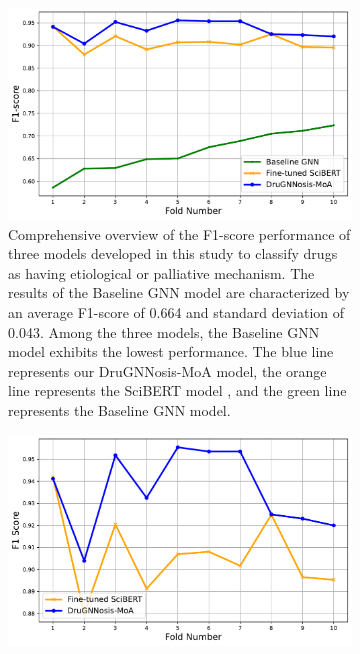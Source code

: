 \documentclass[journal,twoside,web]{ieeecolor}
\begin{document}

\begin{figure}[H]
\centering
\begin{subfigure}[H]{\linewidth}
   \includegraphics[width=\linewidth]{Figures/Comparison_F1_Scores_3_models.pdf}
   \caption{Comprehensive overview of the F1-score performance of three models developed in this study to classify drugs as having etiological or palliative mechanism.
   The results of the Baseline GNN model are characterized by an average F1-score of 0.664 and standard deviation of 0.043.
   Among the three models, the Baseline GNN model exhibits the lowest performance.
   The blue line represents our DruGNNosis-MoA model, the orange line represents the SciBERT model \citep{beltagy2019scibert}, and the green line represents the Baseline GNN model.}
   \label{fig:fscore1a}
\end{subfigure}
\begin{subfigure}[H]{\linewidth}
   \includegraphics[width=\linewidth]{Figures/Comparison_F1_Scores_2_models.pdf}

\end{subfigure}
\end{figure}
\end{document}
